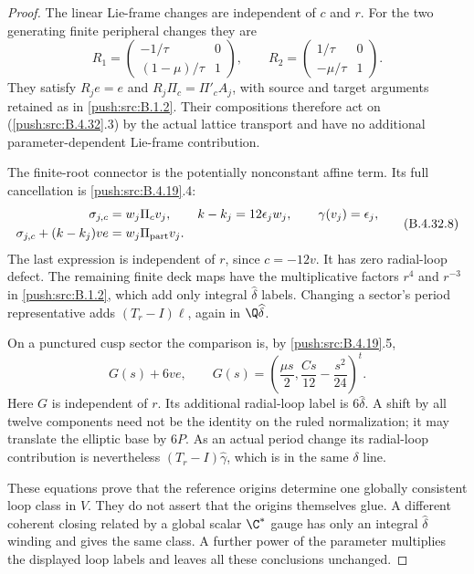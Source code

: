 \begin{proof}
The linear Lie-frame changes are independent of $c$ and $r$.
For the two generating finite peripheral changes they are
\[
 R_1=
 \begin{pmatrix}-1/\tau&0\\(1-\mu)/\tau&1\end{pmatrix},
 \qquad
 R_2=
 \begin{pmatrix}1/\tau&0\\-\mu/\tau&1\end{pmatrix}.
 \tag{B.4.32.7}
\]
They satisfy $R_je=e$ and $R_j\Pi_c=\Pi'_cA_j$, with
source and target arguments retained as in \ref{push:src:B.1.2}. Their
compositions therefore act on (\ref{push:src:B.4.32}.3) by the actual lattice
transport and have no additional parameter-dependent
Lie-frame contribution.

The finite-root connector is the potentially nonconstant
affine term. Its full cancellation is \ref{push:src:B.4.19}.4:
\[
 \begin{split}
  \sigma_{j,c}&=w_j\Pi_c v_j,\qquad
   k-k_j=12\epsilon_jw_j,\qquad
   \gamma(v_j)=\epsilon_j,\\
  \sigma_{j,c}+(k-k_j)ve
     &=w_j\Pi_{\rm part}v_j .
 \end{split}
 \tag{B.4.32.8}
\]
The last expression is independent of $r$, since $c=-12v$.
It has zero radial-loop defect. The remaining finite deck
maps have the multiplicative factors $r^4$ and $r^{-3}$
in \ref{push:src:B.1.2}, which add only integral $\widehat\delta$ labels.
Changing a sector's period representative adds
$(T_r-I)\ell$, again in $\Q\widehat\delta$.

On a punctured cusp sector the comparison is, by \ref{push:src:B.4.19}.5,
\[
 G(s)+6ve,\qquad
 G(s)=\left(\frac{\mu s}{2},
                 \frac{Cs}{12}-\frac{s^2}{24}\right)^t .
 \tag{B.4.32.9}
\]
Here $G$ is independent of $r$. Its additional radial-loop
label is $6\widehat\delta$. A shift by all twelve components
need not be the identity on the ruled normalization; it may
translate the elliptic base by $6P$. As an actual period
change its radial-loop contribution is nevertheless
$(T_r-I)\widehat\gamma$, which is in the same $\delta$ line.

These equations prove that the reference origins determine one
globally consistent loop class in $V$. They do not assert that
the origins themselves glue. A different coherent closing
related by a global scalar $\C^*$ gauge has only an integral
$\widehat\delta$ winding and gives the same class. A further
power of the parameter multiplies the displayed loop labels
and leaves all these conclusions unchanged.


\end{proof}
